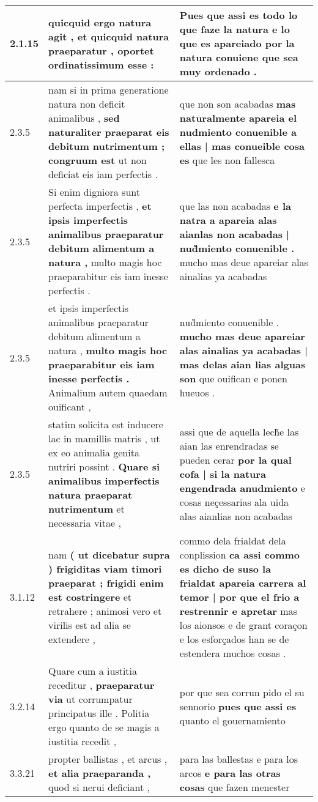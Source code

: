 \begin{tabular}{|p{1cm}|p{6.5cm}|p{6.5cm}|}
2.1.15 & quicquid ergo natura agit , \textbf{ et quicquid natura praeparatur , } oportet ordinatissimum esse : & Pues que assi es todo lo que faze la natura \textbf{ e lo que es apareiado } por la natura conuiene que sea muy ordenado . \\\hline
2.3.5 & nam si in prima generatione natura non deficit animalibus , \textbf{ sed naturaliter praeparat eis debitum nutrimentum ; congruum est } ut non deficiat eis iam perfectis . & que non son acabadas \textbf{ mas naturalmente apareia el nudmiento conuenible a ellas | mas conueible cosa es } que les non fallesca \\\hline
2.3.5 & Si enim digniora sunt perfecta imperfectis , \textbf{ et ipsis imperfectis animalibus praeparatur debitum alimentum a natura , } multo magis hoc praeparabitur eis iam inesse perfectis . & que las non acabadas \textbf{ e la natra a apareia alas aianlas non acabadas | nud̀miento conuenible . } mucho mas deue apareiar alas ainalias ya acabadas \\\hline
2.3.5 & et ipsis imperfectis animalibus praeparatur debitum alimentum a natura , \textbf{ multo magis hoc praeparabitur eis iam inesse perfectis . } Animalium autem quaedam ouificant , & nud̀miento conuenible . \textbf{ mucho mas deue apareiar alas ainalias ya acabadas | mas delas aian lias alguas son } que ouifican e ponen hueuos . \\\hline
2.3.5 & statim solicita est inducere lac in mamillis matris , ut ex eo animalia genita nutriri possint . \textbf{ Quare si animalibus imperfectis natura praeparat nutrimentum } et necessaria vitae , & assi que de aquella lech̃e las aian las enrendradas se pueden cerar \textbf{ por la qual cofa | si la natura engendrada anudmiento } e cosas neçessarias ala uida alas aianlias non acabadas \\\hline
3.1.12 & nam \textbf{ ( ut dicebatur supra ) frigiditas viam timori praeparat ; frigidi enim est costringere } et retrahere ; animosi vero et virilis est ad alia se extendere , & commo dela frialdat dela conplission \textbf{ ca assi commo es dicho de suso la frialdat apareia carrera al temor | por que el frio a restrennir e apretar } mas los aionsos e de grant coraçon e los esforçados han se de estendera muchos cosas . \\\hline
3.2.14 & Quare cum a iustitia receditur , \textbf{ praeparatur via } ut corrumpatur principatus ille . Politia ergo quanto de se magis a iustitia recedit , & por que sea corrun pido el su sennorio \textbf{ pues que assi es } quanto el gouernamiento \\\hline
3.3.21 & propter ballistas , et arcus , \textbf{ et alia praeparanda , } quod si nerui deficiant , & para las ballestas e para los arcos \textbf{ e para las otras cosas } que fazen menester \\\hline

\end{tabular}
